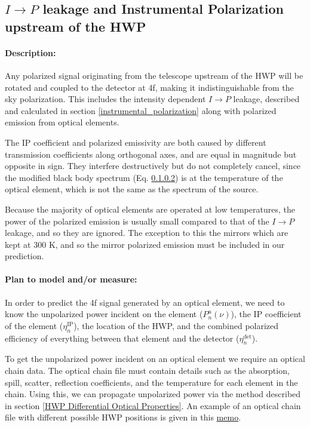 
\subsection{$I\rightarrow P$ leakage and Instrumental Polarization upstream of the HWP}
\label{IP upstream of HWP}

\paragraph{Description:}
Any polarized signal originating from the telescope upstream of the HWP will be rotated and coupled to the detector at 4f,
making it indistinguishable from the sky polarization.
This includes the intensity dependent $I\rightarrow P$ leakage, 
described and calculated in section \ref{instrumental_polarization} 
along with polarized emission from optical elements. 

The IP coefficient and polarized emissivity are both caused by different transmission coefficients along orthogonal axes,
and are equal in magnitude but opposite in sign.
They interfere destructively but do not completely cancel, since the modified black body spectrum (Eq. \ref{}) is at the temperature
of the optical element, which is not the same as the spectrum of the source.

Because the majority of optical elements are operated at low temperatures, 
the power of the polarized emission is usually small compared to that of the $I\rightarrow P$ leakage, and so they are ignored.
The exception to this the mirrors which are kept at 300 K, and so the mirror polarized emission must be included in our prediction.

\paragraph{Plan to model and/or measure:}
In order to predict the 4f signal generated by an optical element, 
we need to know the unpolarized power incident on the element ($P^u_n(\nu)$), the IP coefficient of the element 
($\eta_n^\text{IP}$), the location of the HWP,
and the combined polarized efficiency of everything between that element and the detector ($\eta_n^\text{det}$).

To get the unpolarized power incident on an optical element we require an optical chain data.
The optical chain file must contain details such as the absorption, spill, scatter, reflection coefficients, and 
the temperature for each element in the chain.
Using this, we can propagate unpolarized power via the method described in section \ref{HWP Differential Optical Properties}. 
An example of an optical chain file with different possible HWP positions is given in this 
\href{http://simonsobservatory.wdfiles.com/local--files/calandsys-telecon/eb_leakage_from_pointing_error.pdf?ukey=61f26ef33e8439a4e7096ab52c54c523066a4e35}{memo}.

